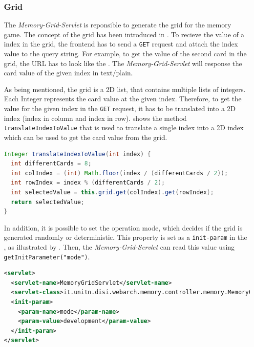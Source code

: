 \subsubsection{Grid}\label{subsubsec:03_impl_backend_grid}
The \textit{Memory-Grid-Servlet} is reponsible to generate the grid for the memory game. The concept of the grid has been introduced in .
To recieve the value of a index in the grid, the frontend has to send a \texttt{GET} request and attach the index value to the query string. For example, to get the value of the second card in the grid, the URL has to look like the .
The \textit{Memory-Grid-Servlet} will response the card value of the given index in text/plain.

As being mentioned, the grid is a 2D list, that contains multiple lists of integers. Each Integer represents the card value at the given index. Therefore, to get the value for the given index in the \texttt{GET} request, it has to be translated into a 2D index (index in column and index in row).  shows the method \texttt{translateIndexToValue} that is used to translate a single index into a 2D index which can be used to get the card value from the grid.
\begin{lstlisting}[label=lst:03_impl_backend_backend_grid_translate, caption=The \texttt{translateIndexToValue} method, language=java]
Integer translateIndexToValue(int index) {
  int differentCards = 8;
  int colIndex = (int) Math.floor(index / (differentCards / 2));
  int rowIndex = index % (differentCards / 2);
  int selectedValue = this.grid.get(colIndex).get(rowIndex);
  return selectedValue;
}
\end{lstlisting}

In addition, it is possible to set the operation mode, which decides if the grid is generated randomly or deterministic. This property is set as a \texttt{init-param} in the , as illustrated by . Then, the \textit{Memory-Grid-Servlet} can read this value using \texttt{getInitParameter("mode")}.
\begin{lstlisting}[label=lst:03_impl_backend_backend_grid_mode, caption=\texttt{init-param} to set the mode, language=xml]
<servlet>
  <servlet-name>MemoryGridServlet</servlet-name>
  <servlet-class>it.unitn.disi.webarch.memory.controller.memory.MemoryGridServlet</servlet-class>
  <init-param>
    <param-name>mode</param-name>
    <param-value>development</param-value>
  </init-param>
</servlet>
\end{lstlisting}


